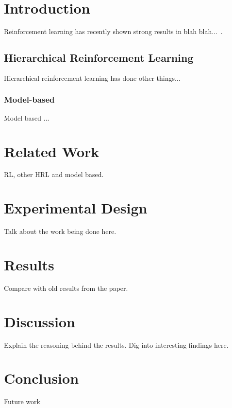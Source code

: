 \section{Introduction}
Reinforcement learning has recently shown strong results in blah blah...~\cite{mnih2015human}.
\subsection{Hierarchical Reinforcement Learning}
Hierarchical reinforcement learning has done other things...
\subsubsection{Model-based}
Model based ...

\section{Related Work}
RL, other HRL and model based.

\section{Experimental Design}
Talk about the work being done here.

\section{Results}
Compare with old results from the paper.

\section{Discussion}
Explain the reasoning behind the results. Dig into interesting findings here.
\section{Conclusion}
Future work